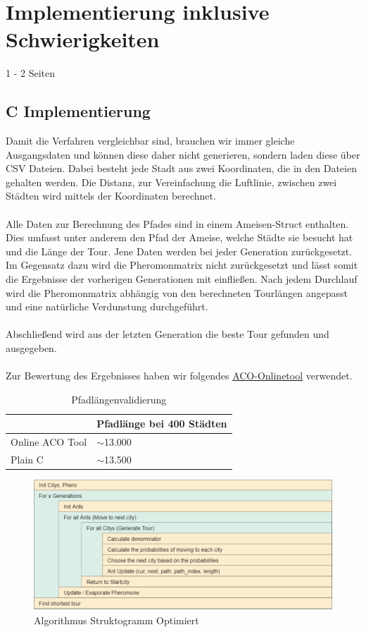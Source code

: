 \section{Implementierung inklusive Schwierigkeiten}
1 - 2 Seiten\\
\subsection*{C Implementierung}

Damit die Verfahren vergleichbar sind, brauchen wir immer gleiche Ausgangsdaten und können diese daher nicht generieren, sondern laden diese über CSV Dateien.
Dabei besteht jede Stadt aus zwei Koordinaten, die in den Dateien gehalten werden.
Die Distanz, zur Vereinfachung die Luftlinie, zwischen zwei Städten wird mittels der Koordinaten berechnet.
\\\\
Alle Daten zur Berechnung des Pfades sind in einem Ameisen-Struct enthalten.
Dies umfasst unter anderem den Pfad der Ameise, welche Städte sie besucht hat und die Länge der Tour.
Jene Daten werden bei jeder Generation zurückgesetzt.
Im Gegensatz dazu wird die Pheromonmatrix nicht zurückgesetzt und lässt somit die Ergebnisse der vorherigen Generationen mit einfließen.
Nach jedem Durchlauf wird die Pheromonmatrix abhängig von den berechneten Tourlängen angepasst und eine natürliche Verdunstung durchgeführt.
\\\\
Abschließend wird aus der letzten Generation die beste Tour gefunden und ausgegeben.
\\\\
Zur Bewertung des Ergebnisses haben wir folgendes \href{https://poolik.github.io/visual-aco/}{ACO-Onlinetool} verwendet.
\begin{table}[h]
    \centering
    \begin{tabular}{|l|l|}
    \hline
                    & Pfadlänge bei 400 Städten     \\ \hline
    Online ACO Tool & $\sim$13.000                  \\ \hline
    Plain C         & $\sim$13.500                  \\ \hline
    \end{tabular}
    \caption{\label{demo-table}Pfadlängenvalidierung}
\end{table}

\begin{figure}[H]
    \centering
    \includegraphics[width=16cm]{../images/struktog-optimiert.png}
    \caption{Algorithmus Struktogramm Optimiert}
    \label{fig:struktogramm-optimiert}
\end{figure}

